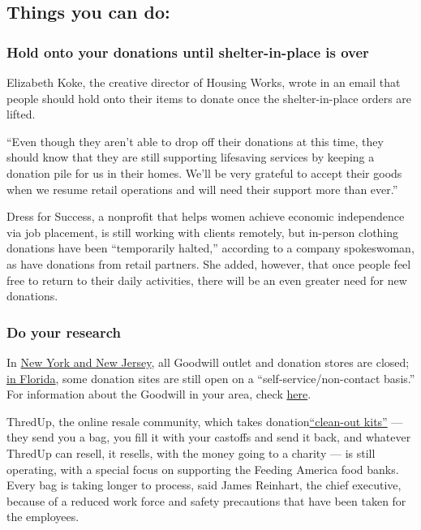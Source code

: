 \hypertarget{things-you-can-do}{%
\subsection{Things you can do:}\label{things-you-can-do}}

\hypertarget{hold-onto-your-donations-until-shelter-in-place-is-over}{%
\subsubsection{Hold onto your donations until shelter-in-place is
over}\label{hold-onto-your-donations-until-shelter-in-place-is-over}}

Elizabeth Koke, the creative director of Housing Works, wrote in an
email that people should hold onto their items to donate once the
shelter-in-place orders are lifted.

``Even though they aren't able to drop off their donations at this time,
they should know that they are still supporting lifesaving services by
keeping a donation pile for us in their homes. We'll be very grateful to
accept their goods when we resume retail operations and will need their
support more than ever.''

Dress for Success, a nonprofit that helps women achieve economic
independence via job placement, is still working with clients remotely,
but in-person clothing donations have been ``temporarily halted,''
according to a company spokeswoman, as have donations from retail
partners. She added, however, that once people feel free to return to
their daily activities, there will be an even greater need for new
donations.

\hypertarget{do-your-research}{%
\subsubsection{Do your research}\label{do-your-research}}

In \href{https://www.goodwillnynj.org/}{New York and New Jersey}, all
Goodwill outlet and donation stores are closed;
\href{https://goodwill-suncoast.org/donation-locations/}{in Florida},
some donation sites are still open on a ``self-service/non-contact
basis.'' For information about the Goodwill in your area, check
\href{https://www.goodwill.org/locator}{here}.

ThredUp, the online resale community, which takes
donation\href{https://www.thredup.com/cleanout}{``clean-out kits''} ---
they send you a bag, you fill it with your castoffs and send it back,
and whatever ThredUp can resell, it resells, with the money going to a
charity --- is still operating, with a special focus on supporting the
Feeding America food banks. Every bag is taking longer to process, said
James Reinhart, the chief executive, because of a reduced work force and
safety precautions that have been taken for the employees.

